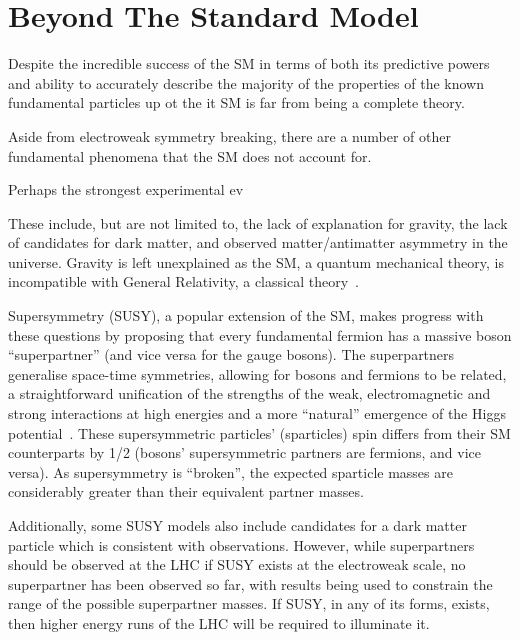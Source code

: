 \section{Beyond The Standard Model}\label{sec:bsm}
Despite the incredible success of the SM in terms of both its predictive powers and ability to accurately describe the majority of the properties of the known fundamental particles up ot the
it SM is far from being a complete theory. 

Aside from electroweak symmetry breaking, there are a number of other fundamental phenomena that the SM does not account for. 

Perhaps the strongest experimental ev

These include, but are not limited to, the lack of explanation for gravity, the lack of candidates for dark matter, and observed matter/antimatter asymmetry in the universe. 
Gravity is left unexplained as the SM, a quantum mechanical theory, is incompatible with General Relativity, a classical theory~\cite{Khalil:2003vd}. 

Supersymmetry (SUSY), a popular extension of the SM, makes progress with these questions by proposing that every fundamental fermion has a massive boson ``superpartner'' (and vice versa for the gauge bosons). 
The superpartners generalise space-time symmetries, allowing for bosons and fermions to be related, a straightforward unification of the strengths of the weak, electromagnetic and strong interactions at high energies and a more ``natural'' emergence of the Higgs potential~\cite{Khalil:2003vd}. 
These supersymmetric particles' (sparticles) spin differs from their SM counterparts by 1/2 (\ie bosons' supersymmetric partners are fermions, and vice versa). 
As supersymmetry is ``broken'', the expected sparticle masses are considerably greater than their equivalent partner masses. 

Additionally, some SUSY models also include candidates for a dark matter particle which is consistent with observations. 
However, while superpartners should be observed at the LHC if SUSY exists at the electroweak scale, no superpartner has been observed so far, with results being used to constrain the range of the possible superpartner masses. 
If SUSY, in any of its forms, exists, then higher energy runs of the LHC will be required to illuminate it.
